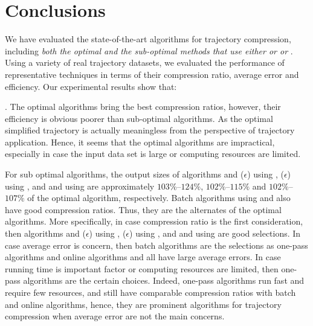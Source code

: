\vspace{-1ex}
\section{Conclusions}

We have evaluated the state-of-the-art \lsa algorithms for trajectory compression, including \emph{both the optimal and the sub-optimal methods that use either \ped or \sed or \dad}.
Using a variety of real trajectory datasets, we evaluated the performance of representative techniques in terms of their compression ratio, average error and efficiency.
Our experimental results show that:


\emph{}. The optimal algorithms bring the best compression ratios, however, their efficiency is obvious poorer than sub-optimal algorithms. As the optimal simplified trajectory is actually meaningless from the perspective of trajectory application. Hence, it seems that the optimal algorithms are impractical, especially in case the input data set is large or computing resources are limited.

For sub optimal algorithms, the output sizes of algorithms \bqsa and \siped($\epsilon$) using \ped, \cised($\epsilon$) using \sed, and \tpa and \interval using \dad are approximately $103\%$--$124\%$, $102\%$--$115\%$ and $102\%$--$107\%$ of the optimal algorithm, respectively. Batch algorithms using \ped and \sed also have good compression ratios. Thus, they are the alternates of the optimal algorithms.
%
More specifically, in case compression ratio is the first consideration, then algorithms \bqsa and \siped($\epsilon$) using \ped, \cised($\epsilon$) using \sed, and \tpa and \interval using \dad are good selections.
%
In case average error is concern, then batch algorithms are the selections as one-pass algorithms and online algorithms \opwa and \bqsa all have large average errors. %
%
In case running time is important factor or computing resources are limited, then one-pass algorithms are the certain choices.
%
Indeed, one-pass algorithms run fast and require few resources, and still have comparable compression ratios with batch and online algorithms, hence, they are prominent algorithms for trajectory compression when average error are not the main concerns.

